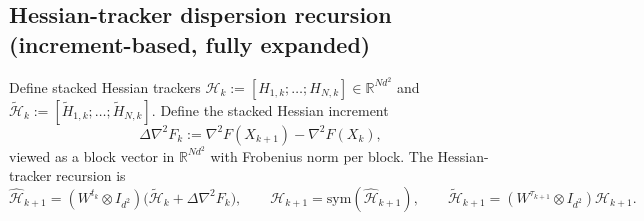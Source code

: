 \documentclass[11pt,a4paper]{article}
\newcommand{\R}{\mathbb{R}}
\begin{document}
\subsection{Hessian-tracker dispersion recursion (increment-based, fully expanded)}

Define stacked Hessian trackers $\mathcal H_k:=[H_{1,k};\dots;H_{N,k}]\in\R^{Nd^2}$ and
$\tilde{\mathcal H}_k:=[\tilde H_{1,k};\dots;\tilde H_{N,k}]$.
Define the stacked Hessian increment
\[
\Delta\nabla^2 F_k:=\nabla^2 F(X_{k+1})-\nabla^2 F(X_k),
\]
viewed as a block vector in $\R^{Nd^2}$ with Frobenius norm per block.
The Hessian-tracker recursion is
\begin{equation}\label{eq:H_update_stack}
\widehat{\mathcal H}_{k+1}=(W^{t_k}\otimes I_{d^2})\big(\tilde{\mathcal H}_k+\Delta\nabla^2 F_k\big),
\qquad
\mathcal H_{k+1}=\mathrm{sym}(\widehat{\mathcal H}_{k+1}),
\qquad
\tilde{\mathcal H}_{k+1}=(W^{\tau_{k+1}}\otimes I_{d^2})\mathcal H_{k+1}.
\end{equation}
\end{document}
